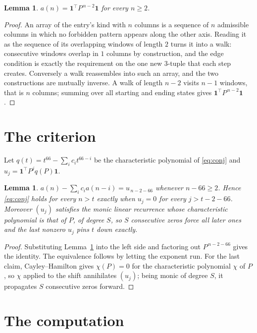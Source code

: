 \documentclass[11pt,a4paper]{article}
\theoremstyle{plain}
\newtheorem{lemma}[theorem]{Lemma}
\theoremstyle{definition}
\begin{document}
\begin{lemma}\label{lem:walk}
$a(n)=\mathbf{1}^{\!\top}P^{\,n-2}\mathbf{1}$ for every $n\ge2$.
\end{lemma}

\begin{proof}
An array of the entry's kind with $n$ columns is a sequence of $n$ admissible columns in
which no forbidden pattern appears along the other axis. Reading it as the sequence of its
overlapping windows of length $2$ turns it into a walk: consecutive windows overlap in
$1$ columns by construction, and the edge condition is exactly the requirement on the one
new $3$-tuple that each step creates. Conversely a walk reassembles into such an array,
and the two constructions are mutually inverse. A walk of length $n-2$ visits $n-1$
windows, that is $n$ columns; summing over all starting and ending states gives
$\mathbf{1}^{\!\top}P^{\,n-2}\mathbf{1}$.
\end{proof}

\section{The criterion}

Let $q(t)=t^{66}-\sum_i c_i t^{66-i}$ be the characteristic polynomial of
\eqref{eq:conj} and $u_j=\mathbf{1}^{\!\top}P^{j}q(P)\mathbf{1}$.

\begin{lemma}\label{lem:crit}
$a(n)-\sum_i c_i a(n-i)=u_{\,n-2-66}$ whenever $n-66\ge2$. Hence
\eqref{eq:conj} holds for every $n>t$ exactly when $u_j=0$ for every
$j>t-2-66$. Moreover $(u_j)$ satisfies the monic linear recurrence whose
characteristic polynomial is that of $P$, of degree $S$, so $S$ consecutive zeros force all
later ones and the last nonzero $u_j$ pins $t$ down exactly.
\end{lemma}

\begin{proof}
Substituting Lemma~\ref{lem:walk} into the left side and factoring out
$P^{\,n-2-66}$ gives the identity. The equivalence follows by letting the exponent
run. For the last claim, Cayley--Hamilton gives $\chi(P)=0$ for the characteristic
polynomial $\chi$ of $P$, so $\chi$ applied to the shift annihilates $(u_j)$; being monic of
degree $S$, it propagates $S$ consecutive zeros forward.
\end{proof}

\section{The computation}
\end{document}
